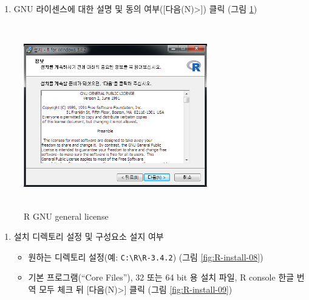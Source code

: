 \documentclass[12pt,a4paper]{book}
\providecommand{\tightlist}{%
  \setlength{\itemsep}{0pt}\setlength{\parskip}{0pt}}
\theoremstyle{definition}
\theoremstyle{definition}
\theoremstyle{definition}
\theoremstyle{remark}
\begin{document}
\begin{enumerate}
\def\labelenumi{\arabic{enumi}.}
\setcounter{enumi}{8}
\tightlist
\item
  GNU 라이센스에 대한 설명 및 동의 여부({[}다음(N)\textgreater{}{]})
  클릭 (그림 \ref{fig:R-install-07})
\end{enumerate}

\begin{figure}[H]
{
  \centering
  \includegraphics[width = 8cm, height = 8cm]{Figures/R-install-F02.png}
  \caption[R GNU general license]{R GNU general license}\label{fig:R-install-07}
}
\end{figure}

\begin{enumerate}
\def\labelenumi{\arabic{enumi}.}
\setcounter{enumi}{9}
\tightlist
\item
  설치 디렉토리 설정 및 구성요소 설지 여부

  \begin{itemize}
  \tightlist
  \item
    원하는 디렉토리 설정(예:
    \texttt{C:\textbackslash{}R\textbackslash{}R-3.4.2}) (그림
    \ref{fig:R-install-08})
  \item
    기본 프로그램(``Core Files''), 32 또는 64 bit 용 설치 파일, R
    console 한글 번역 모두 체크 뒤 {[}다음(N)\textgreater{}{]} 클릭
    (그림 \ref{fig:R-install-09})
  \end{itemize}
\end{enumerate}
\end{document}
